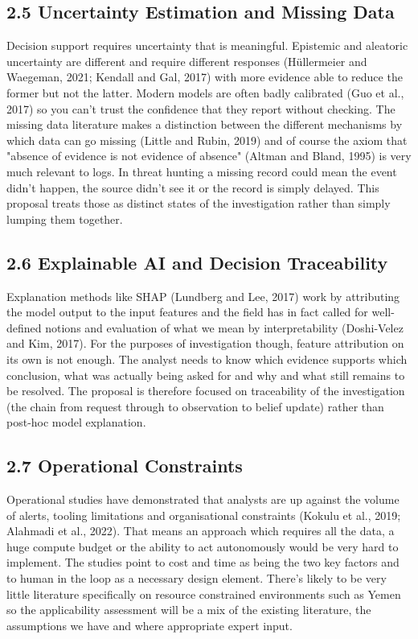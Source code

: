 \documentclass[a4paper,11pt]{article}
\begin{document}
\subsection{2.5 Uncertainty Estimation and Missing Data}
Decision support requires uncertainty that is meaningful. Epistemic and aleatoric uncertainty are different and require different responses (Hüllermeier and Waegeman, 2021; Kendall and Gal, 2017) with more evidence able to reduce the former but not the latter. Modern models are often badly calibrated (Guo et al., 2017) so you can't trust the confidence that they report without checking. The missing data literature makes a distinction between the different mechanisms by which data can go missing (Little and Rubin, 2019) and of course the axiom that "absence of evidence is not evidence of absence" (Altman and Bland, 1995) is very much relevant to logs. In threat hunting a missing record could mean the event didn't happen, the source didn't see it or the record is simply delayed. This proposal treats those as distinct states of the investigation rather than simply lumping them together.\par
\subsection{2.6 Explainable AI and Decision Traceability}
Explanation methods like SHAP (Lundberg and Lee, 2017) work by attributing the model output to the input features and the field has in fact called for well-defined notions and evaluation of what we mean by interpretability (Doshi-Velez and Kim, 2017). For the purposes of investigation though, feature attribution on its own is not enough. The analyst needs to know which evidence supports which conclusion, what was actually being asked for and why and what still remains to be resolved. The proposal is therefore focused on traceability of the investigation (the chain from request through to observation to belief update) rather than post-hoc model explanation.\par
\subsection{2.7 Operational Constraints}
Operational studies have demonstrated that analysts are up against the volume of alerts, tooling limitations and organisational constraints (Kokulu et al., 2019; Alahmadi et al., 2022). That means an approach which requires all the data, a huge compute budget or the ability to act autonomously would be very hard to implement. The studies point to cost and time as being the two key factors and to human in the loop as a necessary design element. There's likely to be very little literature specifically on resource constrained environments such as Yemen so the applicability assessment will be a mix of the existing literature, the assumptions we have and where appropriate expert input.\par
\end{document}
